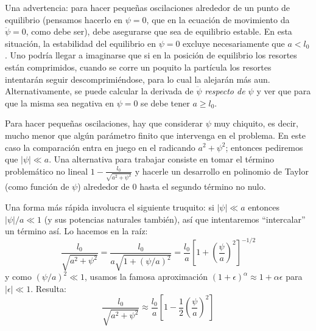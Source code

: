 \documentclass[a4paper,spanish]{article}
\numberwithin{equation}{section}
\begin{document}
Una advertencia: para hacer pequeñas oscilaciones alrededor de un punto de equilibrio (pensamos hacerlo en $\psi=0$, que en la ecuación de movimiento da $\ddot{\psi}=0$, como debe ser), debe asegurarse que sea de equilibrio estable. En esta situación, la estabilidad del equilibrio en $\psi=0$ excluye necesariamente que $a<l_0$. Uno podría llegar a imaginarse que si en la posición de equilibrio los resortes están comprimidos, cuando se corre un poquito la partícula los resortes intentarán seguir descomprimiéndose, para lo cual la alejarán más aun. Alternativamente, se puede calcular la derivada de $\ddot{\psi}$ \textit{respecto de $\psi$} y ver que para que la misma sea negativa en $\psi=0$ se debe tener $a\geq l_0$.

Para hacer pequeñas oscilaciones, hay que considerar $\psi$ muy chiquito, es decir, mucho menor que algún parámetro finito que intervenga en el problema. En este caso la comparación entra en juego en el radicando $a^2+\psi^2$; entonces pediremos que $|\psi| \ll a$. Una alternativa para trabajar consiste en tomar el término problemático no lineal $1-\frac{l_0}{\sqrt{a^2+\psi^2}}$ y hacerle un desarrollo en polinomio de Taylor (como función de $\psi$) alrededor de 0 hasta el segundo término no nulo.

Una forma más rápida involucra el siguiente truquito: si $|\psi| \ll a$ entonces $|\psi|/a \ll 1$ (y sus potencias naturales también), así que intentaremos ``intercalar'' un término así. Lo hacemos en la raíz:
		\[
			\frac{l_0}{\sqrt{a^2+\psi^2}}=\frac{l_0}{a\sqrt{1+(\psi/a)^2}} 
				= \frac{l_0}{a}\left[1+\left(\frac{\psi}{a}\right)^2\right]^{-1/2}
		\]
y como $(\psi/a)^2 \ll 1$, usamos la famosa aproximación $(1+\epsilon)^\alpha \approx 1 + \alpha\epsilon$ para $|\epsilon| \ll 1$. Resulta:
		\[
			\frac{l_0}{\sqrt{a^2+\psi^2}} \approx \frac{l_0}{a}\left[1-\frac{1}{2}\left(\frac{\psi}{a}\right)^2\right]
		\]
\end{document}
